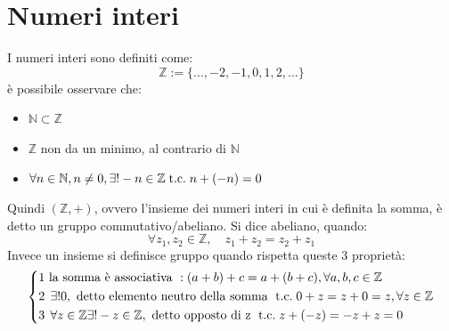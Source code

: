 \documentclass[a4paper, 12pt, openany]{book}
\begin{document}
	\section{Numeri interi}
	I numeri interi sono definiti come:
	\[\mathbb{Z} := \{..., -2, -1, 0, 1, 2, ...\}\]
	è possibile osservare che:
	\begin{itemize}
		\item $\mathbb{N} \subset \mathbb{Z}$
		\item $\mathbb{Z}$ non da un minimo, al contrario di $\mathbb{N}$
		\item $\forall n \in \mathbb{N}, n \not = 0, \exists! -n \in \mathbb{Z} \;\text{t.c.}\; n + (-n) = 0$
	\end{itemize}
	Quindi $(\mathbb{Z}, +)$, ovvero l'insieme dei numeri interi in cui è definita la somma, è detto un gruppo commutativo/abeliano.
	Si dice abeliano, quando:
	\[\forall z_1,z_2 \in \mathbb{Z}, \quad z_1 + z_2 = z_2 + z_1\]
	Invece un insieme si definisce gruppo quando rispetta queste 3 proprietà:
	\[
	\left\{\begin{aligned}
		1 & \text{ la somma è associativa }: (a+b) + c = a + (b + c), \forall a,b,c \in \mathbb{Z}\\
		2 & \; \, \exists! 0, \text{ detto elemento neutro della somma } \;\text{t.c.}\; 0 + z = z + 0 = z, \forall z \in \mathbb{Z}\\
		3 & \; \, \forall z \in \mathbb{Z} \exists! -z \in \mathbb{Z}, \text{ detto opposto di z } \;\text{t.c.}\; z + (-z) = - z + z = 0
	\end{aligned}\right.\]
	
\end{document}
